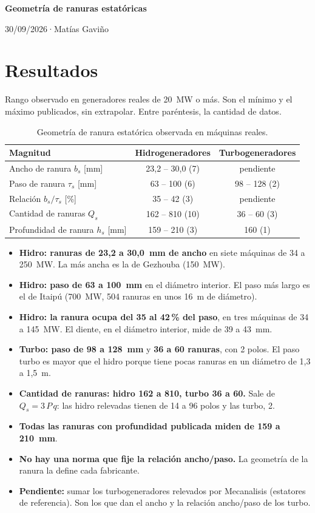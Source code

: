 \documentclass[11pt,a4paper]{article}
\newcommand{\titulo}{Geometría de ranuras estatóricas}
\newcommand{\autor}{Matías Gaviño}
\newcommand{\fecha}{30/09/2026}                    %
\newcommand{\cabecera}{%
  \thispagestyle{fancy}%
  {\fontsize{20}{24}\selectfont\bfseries\titulo\par}%
  \vspace{5pt}%
  {\small\color{gris-medio}\fecha\quad·\quad\autor\par}%
  \vspace{6pt}}
\begin{document}
\cabecera

\section{Resultados}

Rango observado en generadores reales de 20~MW o más. Son el mínimo y el máximo
publicados, sin extrapolar. Entre paréntesis, la cantidad de datos.

\begin{table}[H]\centering\small
\caption{Geometría de ranura estatórica observada en máquinas reales.}
\label{tab:resumen}
\begin{tabular}{l c c}
\toprule
Magnitud & Hidrogeneradores & Turbogeneradores \\
\midrule
Ancho de ranura $b_s$ [mm] & 23,2 -- 30,0 (7) & pendiente \\
Paso de ranura $\tau_s$ [mm] & 63 -- 100 (6) & 98 -- 128 (2) \\
Relación $b_s/\tau_s$ [\%] & 35 -- 42 (3) & pendiente \\
Cantidad de ranuras $Q_s$ & 162 -- 810 (10) & 36 -- 60 (3) \\
Profundidad de ranura $h_s$ [mm] & 159 -- 210 (3) & 160 (1) \\
\bottomrule
\end{tabular}
\end{table}

\begin{itemize}
  \item \textbf{Hidro: ranuras de 23,2 a 30,0~mm de ancho} en siete máquinas de
    34 a 250~MW. La más ancha es la de Gezhouba (150~MW).
  \item \textbf{Hidro: paso de 63 a 100~mm} en el diámetro interior. El paso más
    largo es el de Itaipú (700~MW, 504 ranuras en unos 16~m de diámetro).
  \item \textbf{Hidro: la ranura ocupa del 35 al 42\,\% del paso}, en tres
    máquinas de 34 a 145~MW. El diente, en el diámetro interior, mide de 39 a 43~mm.
  \item \textbf{Turbo: paso de 98 a 128~mm} y \textbf{36 a 60 ranuras}, con 2
    polos. El paso turbo es mayor que el hidro porque tiene pocas ranuras en un
    diámetro de 1,3 a 1,5~m.
  \item \textbf{Cantidad de ranuras: hidro 162 a 810, turbo 36 a 60.} Sale de
    $Q_s = 3\,P\,q$: las hidro relevadas tienen de 14 a 96 polos y las turbo, 2.
  \item \textbf{Todas las ranuras con profundidad publicada miden de 159 a
    210~mm}.
  \item \textbf{No hay una norma que fije la relación ancho/paso.} La geometría
    de la ranura la define cada fabricante.
  \item \textbf{Pendiente:} sumar los turbogeneradores relevados por Mecanalisis
    (estatores de referencia). Son los que dan el ancho y la relación
    ancho/paso de los turbo.
\end{itemize}
\end{document}
